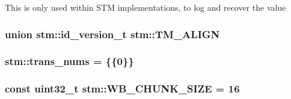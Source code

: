 This is only used within S\-T\-M implementations, to log and recover the value \hypertarget{namespacestm_ae247420ad0ba562827c2cbf18530c271}{
\subsubsection[{T\-M\-\_\-\-A\-L\-I\-G\-N}]{\setlength{\rightskip}{0pt plus 5cm}union {\bf stm\-::id\-\_\-version\-\_\-t}  stm\-::\-T\-M\-\_\-\-A\-L\-I\-G\-N}}\label{namespacestm_ae247420ad0ba562827c2cbf18530c271}
\hypertarget{namespacestm_a8c60f91e3fafc640e3805be4fc4aa121}{
\subsubsection[{trans\-\_\-nums}]{ stm\-::trans\-\_\-nums = \{\{0\}\}}}\label{namespacestm_a8c60f91e3fafc640e3805be4fc4aa121}
\hypertarget{namespacestm_ac13bcf2e446994b6bc58c29f207b61ab}{
\subsubsection[{W\-B\-\_\-\-C\-H\-U\-N\-K\-\_\-\-S\-I\-Z\-E}]{\setlength{\rightskip}{0pt plus 5cm}const uint32\-\_\-t stm\-::\-W\-B\-\_\-\-C\-H\-U\-N\-K\-\_\-\-S\-I\-Z\-E = 16\hspace{0.3cm}{\ttfamily [static]}}}\label{namespacestm_ac13bcf2e446994b6bc58c29f207b61ab}
